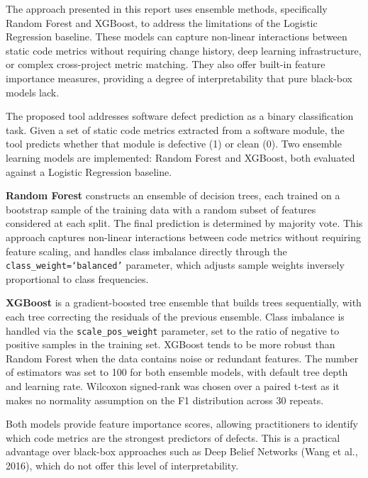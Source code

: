 \documentclass[10pt, a4paper]{article}
\makeatletter
\renewcommand\section{\@startsection{section}{1}{\z@}{0.8em}{0.1em}{\normalfont\Large\bfseries}}
\makeatother
\begin{document}
The approach presented in this report uses ensemble methods, specifically Random Forest and XGBoost, to address the limitations of the Logistic Regression baseline. These models can capture non-linear interactions between static code metrics without requiring change history, deep learning infrastructure, or complex cross-project metric matching. They also offer built-in feature importance measures, providing a degree of interpretability that pure black-box models lack.

\section{Solution}

The proposed tool addresses software defect prediction as a binary classification task. Given a set of static code metrics extracted from a software module, the tool predicts whether that module is defective (1) or clean (0). Two ensemble learning models are implemented: Random Forest and XGBoost, both evaluated against a Logistic Regression baseline.

\textbf{Random Forest} constructs an ensemble of decision trees, each trained on a bootstrap sample of the training data with a random subset of features considered at each split. The final prediction is determined by majority vote. This approach captures non-linear interactions between code metrics without requiring feature scaling, and handles class imbalance directly through the \texttt{class\_weight=`balanced'} parameter, which adjusts sample weights inversely proportional to class frequencies.

\textbf{XGBoost} is a gradient-boosted tree ensemble that builds trees sequentially, with each tree correcting the residuals of the previous ensemble. Class imbalance is handled via the \texttt{scale\_pos\_weight} parameter, set to the ratio of negative to positive samples in the training set. XGBoost tends to be more robust than Random Forest when the data contains noise or redundant features. The number of estimators was set to 100 for both ensemble models, with default tree depth and learning rate. Wilcoxon signed-rank was chosen over a paired t-test as it makes no normality assumption on the F1 distribution across 30 repeats.

Both models provide feature importance scores, allowing practitioners to identify which code metrics are the strongest predictors of defects. This is a practical advantage over black-box approaches such as Deep Belief Networks (Wang et al., 2016), which do not offer this level of interpretability.
\end{document}
